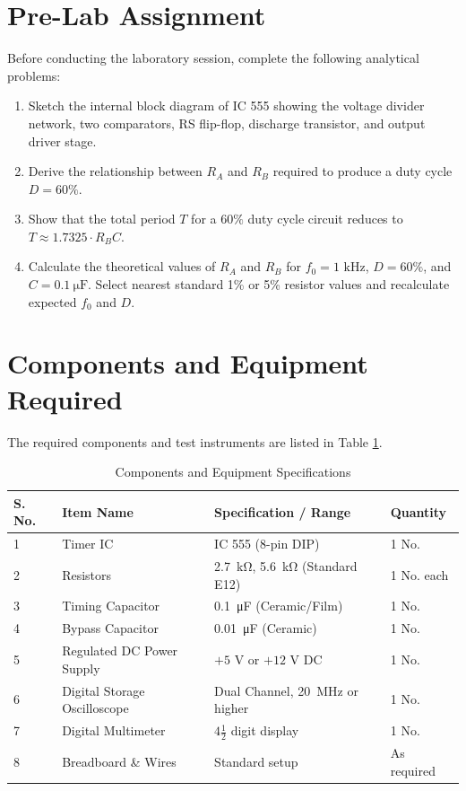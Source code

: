\section{Pre-Lab Assignment}
Before conducting the laboratory session, complete the following analytical problems:
\begin{enumerate}
	\item Sketch the internal block diagram of IC 555 showing the voltage divider network, two comparators, RS flip-flop, discharge transistor, and output driver stage.
	\item Derive the relationship between $R_A$ and $R_B$ required to produce a duty cycle $D = 60\%$.
	\item Show that the total period $T$ for a $60\%$ duty cycle circuit reduces to $T \approx 1.7325 \cdot R_B C$.
	\item Calculate the theoretical values of $R_A$ and $R_B$ for $f_0 = 1\text{ kHz}$, $D = 60\%$, and $C = \SI{0.1}{\micro\farad}$. Select nearest standard 1\% or 5\% resistor values and recalculate expected $f_0$ and $D$.
\end{enumerate}

\section{Components and Equipment Required}
The required components and test instruments are listed in Table \ref{tab:components_astable555}.

\begin{table}[h!]
	\centering
	\caption{Components and Equipment Specifications}
	\label{tab:components_astable555}
	\begin{tabular}{llll}
		\toprule
		\textbf{S. No.} & \textbf{Item Name} & \textbf{Specification / Range} & \textbf{Quantity} \\
		\midrule
		1 & Timer IC & IC 555 (8-pin DIP) & 1 No. \\
		2 & Resistors & \SI{2.7}{\kilo\ohm}, \SI{5.6}{\kilo\ohm} (Standard E12) & 1 No. each \\
		3 & Timing Capacitor & \SI{0.1}{\micro\farad} (Ceramic/Film) & 1 No. \\
		4 & Bypass Capacitor & \SI{0.01}{\micro\farad} (Ceramic) & 1 No. \\
		5 & Regulated DC Power Supply & $+5\text{ V}$ or $+12\text{ V}$ DC & 1 No. \\
		6 & Digital Storage Oscilloscope & Dual Channel, \SI{20}{\mega\hertz} or higher & 1 No. \\
		7 & Digital Multimeter & $4\frac{1}{2}$ digit display & 1 No. \\
		8 & Breadboard \& Wires & Standard setup & As required \\
		\bottomrule
	\end{tabular}
\end{table}


